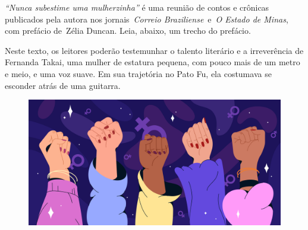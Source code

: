 
\emph{``Nunca subestime uma mulherzinha''} é uma reunião de contos e
crônicas publicados pela autora nos jornais~\emph{Correio
Braziliense}~e~\emph{O Estado de Minas}, com prefácio de~Zélia Duncan. Leia, abaixo, um trecho do prefácio.

\begin{myquote}
Neste texto, os leitores poderão testemunhar o talento literário e a
irreverência de Fernanda Takai, uma mulher de estatura pequena, com
pouco mais de um metro e meio, e uma voz suave. Em sua trajetória no
Pato Fu, ela costumava se esconder atrás de uma guitarra.
\begin{figure}[H]
\centering\includegraphics[width=\textwidth]{./imgSAEB_6_POR/freepik/PORT_6_IMG-7.jpeg}
\end{figure}

\end{myquote}


